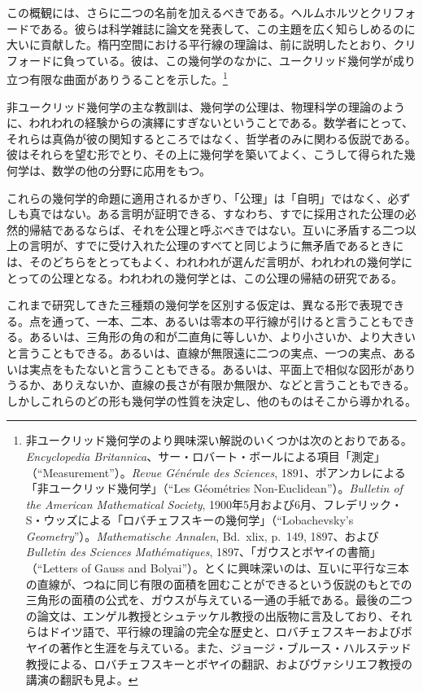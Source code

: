 この概観には、さらに二つの名前を加えるべきである。ヘルムホルツとクリフォードである。彼らは科学雑誌に論文を発表して、この主題を広く知らしめるのに大いに貢献した。楕円空間における平行線の理論は、前に説明したとおり、クリフォードに負っている。彼は、この幾何学のなかに、ユークリッド幾何学が成り立つ有限な曲面がありうることを示した。\footnote{非ユークリッド幾何学のより興味深い解説のいくつかは次のとおりである。\emph{Encyclopedia Britannica}、サー・ロバート・ボールによる項目「測定」（``Measurement''）。\emph{Revue Générale des Sciences}, 1891、ポアンカレによる「非ユークリッド幾何学」（``Les Géométries Non-Euclidean''）。\emph{Bulletin of the American Mathematical Society}, 1900年5月および6月、フレデリック・S・ウッズによる「ロバチェフスキーの幾何学」（``Lobachevsky's \emph{Geometry}''）。\emph{Mathematische Annalen}, Bd.~xlix, p.~149, 1897、および\emph{Bulletin des Sciences Mathématiques}, 1897、「ガウスとボヤイの書簡」（``Letters of Gauss and Bolyai''）。とくに興味深いのは、互いに平行な三本の直線が、つねに同じ有限の面積を囲むことができるという仮説のもとでの三角形の面積の公式を、ガウスが与えている一通の手紙である。最後の二つの論文は、エンゲル教授とシュテッケル教授の出版物に言及しており、それらはドイツ語で、平行線の理論の完全な歴史と、ロバチェフスキーおよびボヤイの著作と生涯を与えている。また、ジョージ・ブルース・ハルステッド教授による、ロバチェフスキーとボヤイの翻訳、およびヴァシリエフ教授の講演の翻訳も見よ。}

非ユークリッド幾何学の主な教訓は、幾何学の公理は、物理科学の理論のように、われわれの経験からの演繹にすぎないということである。数学者にとって、それらは真偽が彼の関知するところではなく、哲学者のみに関わる仮説である。彼はそれらを望む形でとり、その上に幾何学を築いてよく、こうして得られた幾何学は、数学の他の分野に応用をもつ。

これらの幾何学的命題に適用されるかぎり、「公理」は「自明」ではなく、必ずしも真ではない。ある言明が証明できる、すなわち、すでに採用された公理の必然的帰結であるならば、それを公理と呼ぶべきではない。互いに矛盾する二つ以上の言明が、すでに受け入れた公理のすべてと同じように無矛盾であるときには、そのどちらをとってもよく、われわれが選んだ言明が、われわれの幾何学にとっての公理となる。われわれの幾何学とは、この公理の帰結の研究である。

これまで研究してきた三種類の幾何学を区別する仮定は、異なる形で表現できる。点を通って、一本、二本、あるいは零本の平行線が引けると言うこともできる。あるいは、三角形の角の和が二直角に等しいか、より小さいか、より大きいと言うこともできる。あるいは、直線が無限遠に二つの実点、一つの実点、あるいは実点をもたないと言うこともできる。あるいは、平面上で相似な図形がありうるか、ありえないか、直線の長さが有限か無限か、などと言うこともできる。しかしこれらのどの形も幾何学の性質を決定し、他のものはそこから導かれる。
